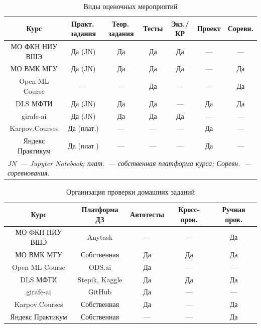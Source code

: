 \begin{table}[h!]
\caption{Виды оценочных мероприятий}
\label{tab:courses_assessment}
\centering
\footnotesize
\setlength{\tabcolsep}{3pt}
\begin{tabular}{|c|c|c|c|c|c|c|}
\hline
\textbf{Курс} &
\textbf{Практ.\,задания} &
\textbf{Теор.\,задания} &
\textbf{Тесты} &
\textbf{Экз./КР} &
\textbf{Проект} &
\textbf{Соревн.} \\
\hline
МО ФКН НИУ ВШЭ   & Да (JN)    & Да  & Да   & Да  & ---  & ---  \\
\hline
МО ВМК МГУ       & Да (JN)    & Да  & Да   & Да  & ---  & Да   \\
\hline
Open ML Course   & ---        & --- & Да   & --- & ---  & Да   \\
\hline
DLS МФТИ         & Да (JN)    & Да  & Да   & --- & Да   & Да   \\
\hline
girafe-ai        & Да (JN)    & Да  & Да   & Да  & ---  & ---  \\
\hline
Karpov.Courses   & Да (плат.) & --- & ---  & --- & Да   & ---  \\
\hline
Яндекс Практикум & Да (плат.) & --- & ---  & --- & Да   & ---  \\
\hline
\multicolumn{7}{|l|}{\textit{JN~--- Jupyter Notebook; плат.~--- собственная платформа курса;
Соревн.~--- соревнования.}} \\
\hline
\end{tabular}
\end{table}

\begin{table}[h!]
\caption{Организация проверки домашних заданий}
\label{tab:courses_grading}
\centering
\footnotesize
\setlength{\tabcolsep}{3pt}
\begin{tabular}{|c|c|c|c|c|}
\hline
\textbf{Курс} &
\textbf{Платформа ДЗ} &
\textbf{Автотесты} &
\textbf{Кросс-пров.} &
\textbf{Ручная пров.} \\
\hline
МО ФКН НИУ ВШЭ   & Anytask          & ---    & ---  & Да \\
\hline
МО ВМК МГУ       & Собственная      & Да     & Да   & Да \\
\hline
Open ML Course   & ODS.ai           & Да     & ---  & --- \\
\hline
DLS МФТИ         & Stepik, Kaggle   & Да     & Да   & Да  \\
\hline
girafe-ai        & GitHub           & Да     & ---  & --- \\
\hline
Karpov.Courses   & Собственная      & Да     & ---  & Да  \\
\hline
Яндекс Практикум & Собственная      & ---    & ---  & Да  \\
\hline
\end{tabular}
\end{table}

